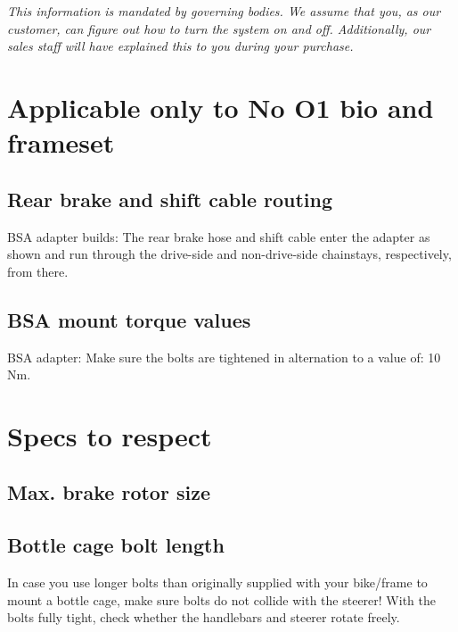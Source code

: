 \documentclass[12 pt]{article}
\newcommand{\bodyimage}[1]{\rightline{}}}
\begin{document}
{\it *This information is mandated by governing bodies. We assume that
  you, as our customer, can figure out how to turn the system on and
  off. Additionally, our sales staff will have explained this to you
  during your purchase.}

\bodyimage{5_6_no_o1_electric_power_button.svg}

\section{Applicable only to No O1 bio and frameset}

\subsection{Rear brake and shift cable routing}

BSA adapter builds: The rear brake hose and shift cable enter the
adapter as shown and run through the drive-side and non-drive-side
chainstays, respectively, from there.

\bodyimage{6_1_bio_frameset_rear_shift_cable_routing.svg}

\subsection{BSA mount torque values}

BSA adapter: Make sure the bolts are tightened in alternation to a
value of: 10 Nm.

\bodyimage{6_2_bio_frameset_mount_torque_values.svg}

\section{Specs to respect}

\subsection{Max. brake rotor size}

\bodyimage{7_1_specs_to_respect_rotor.svg}

\subsection{Bottle cage bolt length}

In case you use longer bolts than originally supplied with your
bike/frame to mount a bottle cage, make sure bolts do not collide with
the steerer! With the bolts fully tight, check whether the handlebars
and steerer rotate freely.
\end{document}

